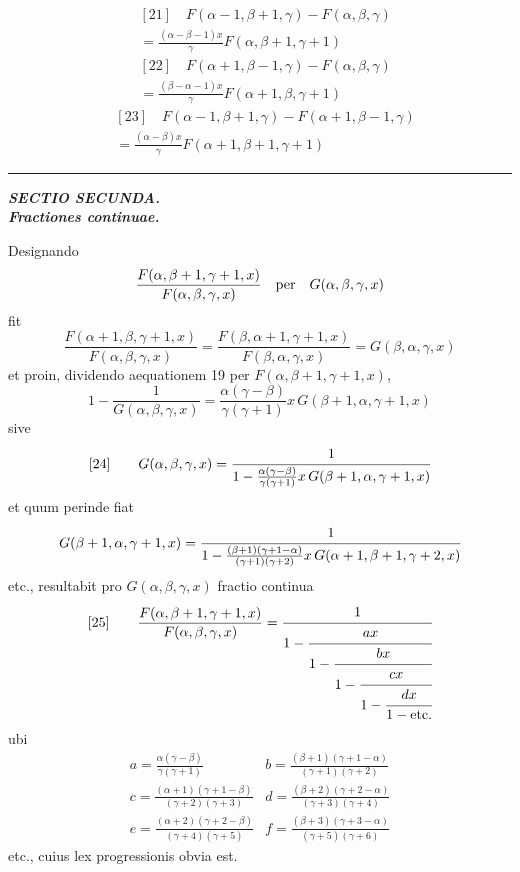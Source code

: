 \[
\begin{aligned}&[21]\quad F(\alpha-1,\beta+1,\gamma)-F(\alpha,\beta,\gamma)\\&{}=\frac{(\alpha-\beta-1)x}{\gamma}F(\alpha,\beta+1,\gamma+1)
\end{aligned}
\]
\[
\begin{aligned}&[22]\quad F(\alpha+1,\beta-1,\gamma)-F(\alpha,\beta,\gamma)\\&{}=\frac{(\beta-\alpha-1)x}{\gamma}F(\alpha+1,\beta,\gamma+1)
\end{aligned}
\]
\[
\begin{aligned}&[23]\quad F(\alpha-1,\beta+1,\gamma)-F(\alpha+1,\beta-1,\gamma)\\&{}=\frac{(\alpha-\beta)x}{\gamma}F(\alpha+1,\beta+1,\gamma+1)
\end{aligned}
\]
\begin{center}\rule{.24\linewidth}{.3pt}\end{center}
\par{}\begin{center}\textbf{\textit{SECTIO SECUNDA.}}\\[6pt]\textbf{\textit{Fractiones continuae.}}\end{center}
Designando
\[
\frac{F(\alpha,\beta+1,\gamma+1,x)}{F(\alpha,\beta,\gamma,x)}\quad\hbox{per}\quad G(\alpha,\beta,\gamma,x)
\]
fit
\[
\frac{F(\alpha+1,\beta,\gamma+1,x)}{F(\alpha,\beta,\gamma,x)}=\frac{F(\beta,\alpha+1,\gamma+1,x)}{F(\beta,\alpha,\gamma,x)}=G(\beta,\alpha,\gamma,x)
\]
et proin, dividendo aequationem 19 per $F(\alpha,\beta+1,\gamma+1,x)$,
\[
1-\frac{1}{G(\alpha,\beta,\gamma,x)}=\frac{\alpha(\gamma-\beta)}{\gamma(\gamma+1)}x\,G(\beta+1,\alpha,\gamma+1,x)
\]
sive
\[
[24]\qquad G(\alpha,\beta,\gamma,x)=\cfrac{1}{1-\frac{\alpha(\gamma-\beta)}{\gamma(\gamma+1)}x\,G(\beta+1,\alpha,\gamma+1,x)}
\]
et quum perinde fiat
\[
G(\beta+1,\alpha,\gamma+1,x)=\cfrac{1}{1-\frac{(\beta+1)(\gamma+1-\alpha)}{(\gamma+1)(\gamma+2)}x\,G(\alpha+1,\beta+1,\gamma+2,x)}
\]
etc., resultabit pro $G(\alpha,\beta,\gamma,x)$ fractio continua
\[
[25]\qquad\frac{F(\alpha,\beta+1,\gamma+1,x)}{F(\alpha,\beta,\gamma,x)}=\cfrac{1}{1-\cfrac{ax}{1-\cfrac{bx}{1-\cfrac{cx}{1-\cfrac{dx}{1-\hbox{etc.}}}}}}
\]
ubi
\[
\begin{array}{ll}
a=\frac{\alpha(\gamma-\beta)}{\gamma(\gamma+1)}&b=\frac{(\beta+1)(\gamma+1-\alpha)}{(\gamma+1)(\gamma+2)}\\[6pt]
c=\frac{(\alpha+1)(\gamma+1-\beta)}{(\gamma+2)(\gamma+3)}&d=\frac{(\beta+2)(\gamma+2-\alpha)}{(\gamma+3)(\gamma+4)}\\[6pt]
e=\frac{(\alpha+2)(\gamma+2-\beta)}{(\gamma+4)(\gamma+5)}&f=\frac{(\beta+3)(\gamma+3-\alpha)}{(\gamma+5)(\gamma+6)}
\end{array}
\]
etc., cuius lex progressionis obvia est.

